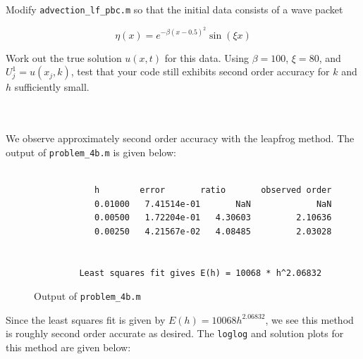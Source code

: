 Modify \texttt{advection\_lf\_pbc.m} so that the initial data consists of a wave packet

$$
\eta(x) = e^{-\beta (x - 0.5)^2}\sin{(\xi x)}
$$

Work out the true solution $u(x, t)$ for this data. Using $\beta = 100$, $\xi = 80$, and $U_j^1 = u(x_j, k)$, test that
your code still exhibits second order accuracy for $k$ and $h$ sufficiently small.

\begin{solution}\ \\\\
    We observe approximately second order accuracy with the leapfrog method. The output of \texttt{problem\_4b.m} is
    given below: \ \\\\

    \begin{figure}[h]
        \begin{verbatim}
            h        error       ratio       observed order
            0.01000   7.41514e-01       NaN             NaN
            0.00500   1.72204e-01   4.30603         2.10636
            0.00250   4.21567e-02   4.08485         2.03028
          
          
         Least squares fit gives E(h) = 10068 * h^2.06832
        \end{verbatim}
        \caption{Output of \texttt{problem\_4b.m}}
    \end{figure}

    Since the least squares fit is given by $E(h) = 10068 h^{2.06832}$, we see this method is roughly second order 
    accurate as desired. The \texttt{loglog} and solution plots for this method are given below:


\end{solution}
